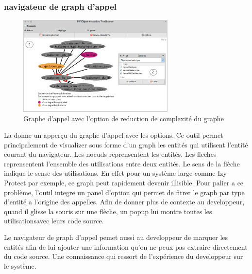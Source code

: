 \documentclass[a4paper]{article}
\begin{document}
\subsubsection{navigateur de graph d'appel}
\begin{figure}[htbp]
  \begin{center}
  \includegraphics[width=0.7\textwidth]{./figures/callGraphBrowser.png}
  \caption{Graphe d'appel avec l'option de reduction de complexité du graphe}
  \label{fig:graphAppel}
\end{center}
\vspace{-0.3cm}
\end{figure}
La  donne un apperçu du graphe d'appel avec les options. 
Ce outil permet principalement de visualizer sous forme d'un graph les entités qui utilisent l'entité courant du navigateur.
Les noeuds reprensentent les entités. Les fleches reprensentent l'ensemble des utilisations entre deux entités.
Le sens de la flèche indique le sense des utilisations.
En effet pour un système large comme Izy Protect par exemple, ce graph peut rapidement devenir illisible. 
Pour palier a ce problème, l'outil integre un panel d'option qui permet de fitrer le graph par type d'entité a l'origine des appelles.
Afin de donner plus de contexte au developpeur, quand  il glisse la souris sur une flèche,  un popup lui montre toutes les utilisationsavec leurs code source.

Le navigateur de graph d'appel pemet aussi au developpeur de marquer les entités afin de lui ajouter une information qu'on ne peux pas extraire directement du code source.
Une connaissance qui ressort de l'expérience du developpeur sur le système.
\end{document}
